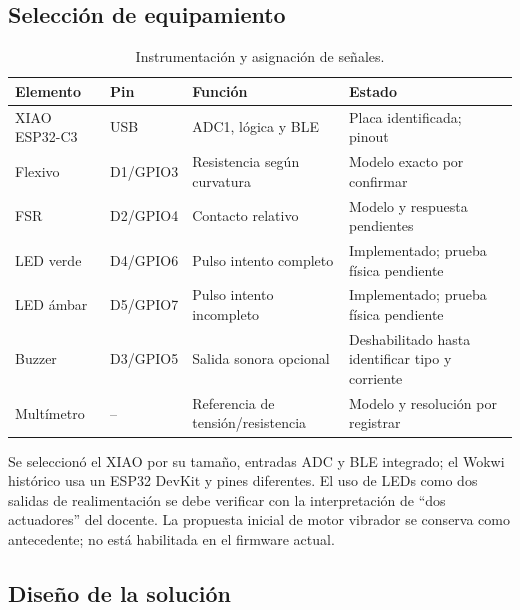 \documentclass[11pt,letterpaper]{article}
\newcommand{\tabsmall}{\fontsize{10}{12}\selectfont}
\begin{document}
\subsection{Selección de equipamiento}
\begin{table}[htbp]\centering\tabsmall\caption{Instrumentación y asignación de señales.}\label{tab:inst}
\begin{tabularx}{\linewidth}{@{}l l Y Y@{}}\toprule Elemento & Pin & Función & Estado \\\midrule
XIAO ESP32-C3 & USB & ADC1, lógica y BLE & Placa identificada; pinout \cite{xiao}\\
Flexivo & D1/GPIO3 & Resistencia según curvatura & Modelo exacto por confirmar\\
FSR & D2/GPIO4 & Contacto relativo & Modelo y respuesta pendientes\\
LED verde & D4/GPIO6 & Pulso intento completo & Implementado; prueba física pendiente\\
LED ámbar & D5/GPIO7 & Pulso intento incompleto & Implementado; prueba física pendiente\\
Buzzer & D3/GPIO5 & Salida sonora opcional & Deshabilitado hasta identificar tipo y corriente\\
Multímetro & -- & Referencia de tensión/resistencia & Modelo y resolución por registrar\\\bottomrule\end{tabularx}
\end{table}
Se seleccionó el XIAO por su tamaño, entradas ADC y BLE integrado; el Wokwi histórico usa un ESP32 DevKit y pines diferentes. El uso de LEDs como dos salidas de realimentación se debe verificar con la interpretación de ``dos actuadores'' del docente. La propuesta inicial de motor vibrador se conserva como antecedente; no está habilitada en el firmware actual.
\subsection{Diseño de la solución}
\end{document}
